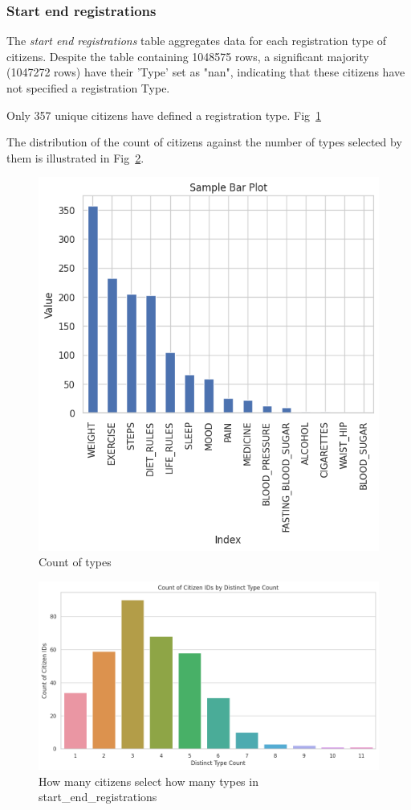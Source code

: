 \documentclass[12pt]{article}
\begin{document}
\subsubsection{Start end registrations}
The \textit{start end registrations} table aggregates data for each registration type of citizens. 
Despite the table containing 1048575 rows, a significant majority (1047272 rows) have their 'Type' set as "nan", indicating that these citizens have not specified a registration Type.

Only 357 unique citizens have defined a registration type. 
Fig~\ref{fig:countoftypes}

The distribution of the count of citizens against the number of types selected by them is illustrated in Fig~\ref{fig:howmanytypes}.

\begin{figure}[h]
\centering
\includegraphics[width=0.7\linewidth]{images/reg_types.png}
\caption{Count of types}
\label{fig:countoftypes}
\end{figure}

\begin{figure}[h]
\centering
\includegraphics[width=0.7\linewidth]{images/start_end_reg_count.png}
\caption{How many citizens select how many types in start\_end\_registrations}
\label{fig:howmanytypes}
\end{figure}
\end{document}
